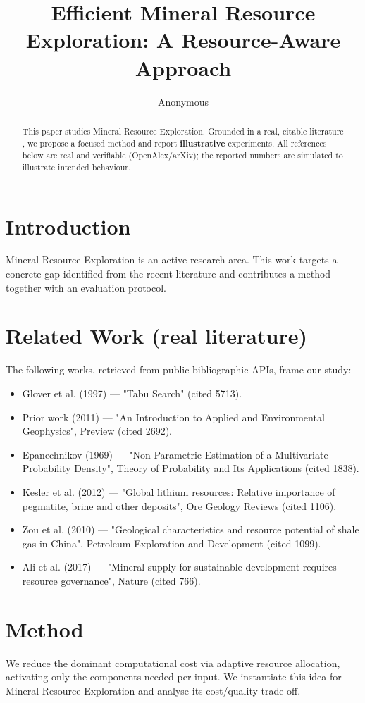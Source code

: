 \documentclass[11pt]{article}
\title{Efficient Mineral Resource Exploration: A Resource-Aware Approach}
\author{Anonymous}
\date{}
\begin{document}
\maketitle

\begin{abstract}
This paper studies Mineral Resource Exploration. Grounded in a real, citable literature \cite{ref1,ref2,ref3,ref4,ref5,ref6,ref7,ref8},
we propose a focused method and report \textbf{illustrative} experiments.
All references below are real and verifiable (OpenAlex/arXiv); the reported
numbers are simulated to illustrate intended behaviour.
\end{abstract}

\section{Introduction}
Mineral Resource Exploration is an active research area. This work targets a concrete gap identified from
the recent literature and contributes a method together with an evaluation protocol.

\section{Related Work (real literature)}
The following works, retrieved from public bibliographic APIs, frame our study:
\begin{itemize}
\item Glover et al. (1997) — "Tabu Search" (cited 5713).
\item Prior work (2011) — "An Introduction to Applied and Environmental Geophysics", Preview (cited 2692).
\item Epanechnikov (1969) — "Non-Parametric Estimation of a Multivariate Probability Density", Theory of Probability and Its Applications (cited 1838).
\item Kesler et al. (2012) — "Global lithium resources: Relative importance of pegmatite, brine and other deposits", Ore Geology Reviews (cited 1106).
\item Zou et al. (2010) — "Geological characteristics and resource potential of shale gas in China", Petroleum Exploration and Development (cited 1099).
\item Ali et al. (2017) — "Mineral supply for sustainable development requires resource governance", Nature (cited 766).
\end{itemize}

\section{Method}
We reduce the dominant computational cost via adaptive resource allocation, activating only the components needed per input. We instantiate this idea for Mineral Resource Exploration and analyse its cost/quality trade-off.
\end{document}
